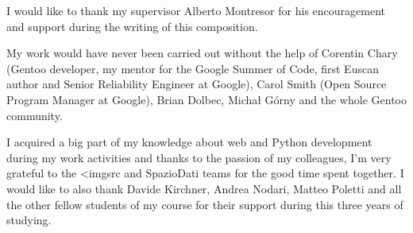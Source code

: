 
I would like to thank my supervisor Alberto Montresor for his encouragement and support during the writing of this composition.

My work would have never been carried out without the help of Corentin Chary (Gentoo developer, my mentor for the Google Summer of Code, first Euscan author and Senior Reliability Engineer at Google), Carol Smith (Open Source Program Manager at Google), Brian Dolbec, Michał Górny and the whole Gentoo community.

I acquired a big part of my knowledge about web and Python development during my work activities and thanks to the passion of my colleagues, I’m very grateful to the <imgsrc and SpazioDati teams for the good time spent together.
I would like to also thank Davide Kirchner, Andrea Nodari, Matteo Poletti and all the other fellow students of my course for their support during this three years of studying.